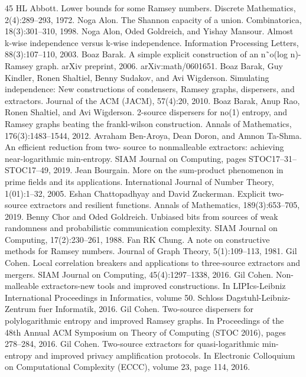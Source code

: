 \documentclass[10pt,a4paper]{article}
\begin{document}
\begin{thebibliography}{45}
 HL Abbott. Lower bounds for some Ramsey numbers. Discrete Mathematics, 2(4):289–293, 1972.
 Noga Alon. The Shannon capacity of a union. Combinatorica, 18(3):301–310, 1998.
 Noga Alon, Oded Goldreich, and Yishay Mansour. Almost k-wise independence versus k-wise independence. Information Processing Letters, 88(3):107–110, 2003.
 Boaz Barak. A simple explicit construction of an n˜o(log n)-Ramsey graph. arXiv preprint, 2006. arXiv:math/0601651.
 Boaz Barak, Guy Kindler, Ronen Shaltiel, Benny Sudakov, and Avi Wigderson. Simulating independence: New constructions of condensers, Ramsey graphs, dispersers, and extractors. Journal of the ACM (JACM), 57(4):20, 2010.
 Boaz Barak, Anup Rao, Ronen Shaltiel, and Avi Wigderson. 2-source dispersers for no(1) entropy, and Ramsey graphs beating the frankl-wilson construction. Annals of Mathematics, 176(3):1483–1544, 2012.
 Avraham Ben-Aroya, Dean Doron, and Amnon Ta-Shma. An efficient reduction from two- source to nonmalleable extractors: achieving near-logarithmic min-entropy. SIAM Journal on Computing, pages STOC17–31–STOC17–49, 2019.
 Jean Bourgain. More on the sum-product phenomenon in prime fields and its applications. International Journal of Number Theory, 1(01):1–32, 2005.
 Eshan Chattopadhyay and David Zuckerman. Explicit two-source extractors and resilient functions. Annals of Mathematics, 189(3):653–705, 2019.
 Benny Chor and Oded Goldreich. Unbiased bits from sources of weak randomness and probabilistic communication complexity. SIAM Journal on Computing, 17(2):230–261, 1988.
 Fan RK Chung. A note on constructive methods for Ramsey numbers. Journal of Graph Theory, 5(1):109–113, 1981.
 Gil Cohen. Local correlation breakers and applications to three-source extractors and mergers. SIAM Journal on Computing, 45(4):1297–1338, 2016.
 Gil Cohen. Non-malleable extractors-new tools and improved constructions. In LIPIcs-Leibniz International Proceedings in Informatics, volume 50. Schloss Dagstuhl-Leibniz-Zentrum fuer Informatik, 2016.
 Gil Cohen. Two-source dispersers for polylogarithmic entropy and improved Ramsey graphs. In Proceedings of the 48th Annual ACM Symposium on Theory of Computing (STOC 2016), pages 278–284, 2016.
 Gil Cohen. Two-source extractors for quasi-logarithmic min-entropy and improved privacy amplification protocols. In Electronic Colloquium on Computational Complexity (ECCC), volume 23, page 114, 2016.

\end{thebibliography}
\end{document}
